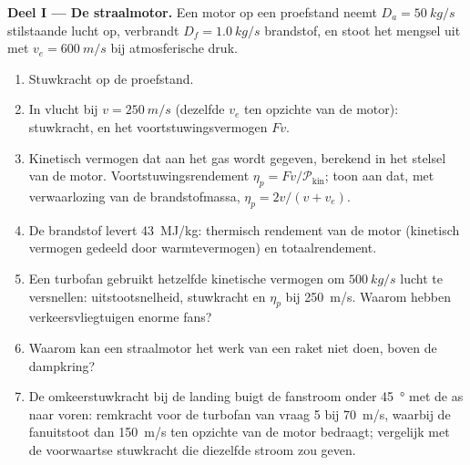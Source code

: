 \begin{problem}
\label{pb:b2:flow-balances:1}

\medskip
\noindent\textbf{Deel I --- De straalmotor.}
Een motor op een proefstand neemt $D_a = \qty{50}{kg/s}$ stilstaande lucht
op, verbrandt $D_f = \qty{1.0}{kg/s}$ brandstof, en stoot het mengsel uit
met $v_e =
\qty{600}{m/s}$ bij atmosferische druk.
\begin{enumerate}
  \item Stuwkracht op de proefstand.
  \item In vlucht bij $v = \qty{250}{m/s}$ (dezelfde $v_e$ ten opzichte van
        de motor): stuwkracht, en het voortstuwingsvermogen $Fv$.
  \item Kinetisch vermogen dat aan het gas wordt gegeven, berekend in het
        stelsel van de motor. Voortstuwingsrendement
        $\eta_p = Fv/\mathcal P_{\text{kin}}$; toon aan dat, met
        verwaarlozing van de brandstofmassa, $\eta_p = 2v/(v + v_e)$.
  \item De brandstof levert \qty{43}{MJ/kg}: thermisch rendement van de
        motor (kinetisch vermogen gedeeld door warmtevermogen) en
        totaalrendement.
  \item Een turbofan gebruikt hetzelfde kinetische vermogen om
        $\qty{500}{kg/s}$ lucht te versnellen: uitstootsnelheid, stuwkracht
        en $\eta_p$ bij \qty{250}{m/s}. Waarom hebben verkeersvliegtuigen
        enorme fans?
  \item Waarom kan een straalmotor het werk van een raket niet doen, boven
        de dampkring?
  \item De omkeerstuwkracht bij de landing buigt de fanstroom onder
        \qty{45}{\degree} met de as naar voren: remkracht voor de turbofan
        van vraag 5 bij \qty{70}{m/s}, waarbij de fanuitstoot dan
        \qty{150}{m/s} ten opzichte van de motor bedraagt; vergelijk met de
        voorwaartse stuwkracht die diezelfde stroom zou geven.
\end{enumerate}


\end{problem}

